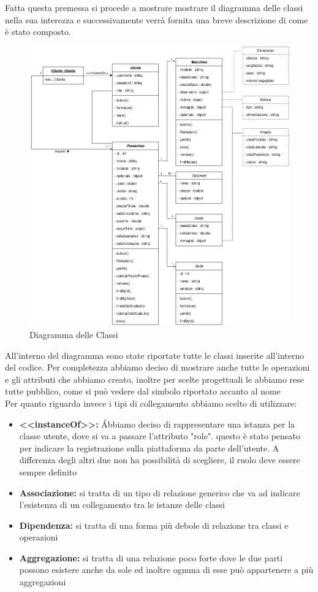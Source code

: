 \documentclass[a4paper, 11pt,oneside]{book}
\newcommand{\spacing}{\par\bigskip\noindent}
\begin{document}
    Fatta questa premessa si procede a mostrare mostrare il diagramma delle classi nella sua interezza e successivamente verrà fornita una breve descrizione di come è stato composto.
    \begin{figure}[H]
        \includegraphics[width=\textwidth]{diagramma_delle_classi.png}
        \caption{Diagramma delle Classi}
        \label{fig:diagramma_delle_classi}
    \end{figure}
    \spacing
    All'interno del diagramma sono state riportate tutte le classi inserite all'interno del codice. Per completezza abbiamo deciso di mostrare anche tutte le operazioni e gli attributi che abbiamo creato, inoltre per scelte progettuali le abbiamo rese tutte
    pubblico, come si può vedere dal simbolo riportato accanto al nome\\
    Per quanto riguarda invece i tipi di collegamento abbiamo scelto di utilizzare:
    \begin{itemize}
        \item \textbf{<<instanceOf>>:} \'Abbiamo deciso di rappresentare una istanza per la classe utente, dove si va a passare l'attributo "role". questo
              è stato pensato per indicare la registrazione sulla piattaforma da parte dell'utente. A differenza degli altri due non ha possibilità di scegliere, il ruolo deve essere sempre definito
        \item \textbf{Associazione:} si tratta di un tipo di relazione generico che va ad indicare l'esistenza di un collegamento tra le istanze delle classi
        \item \textbf{Dipendenza:} si tratta di una forma più debole di relazione tra classi e operazioni
        \item \textbf{Aggregazione:} si tratta di una relazione poco forte dove le due parti possono esistere anche da sole ed inoltre ognuna di esse può appartenere a più aggregazioni
    \end{itemize}
\end{document}
